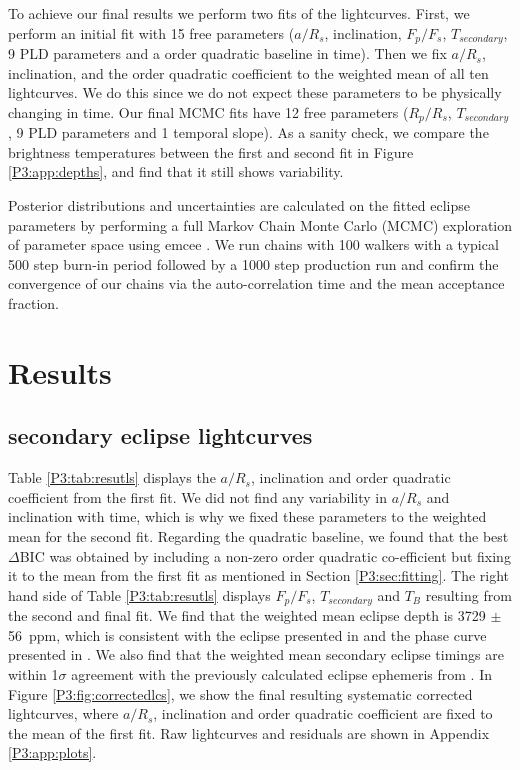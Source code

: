 To achieve our final results we perform two fits of the lightcurves. First, we perform an initial fit with 15 free parameters ($a/R_s$, inclination, $F_p/F_s$, $T_{secondary}$, 9 PLD parameters and a  order quadratic baseline in time). Then we fix $a/R_s$, inclination, and the  order quadratic coefficient to the weighted mean of all ten lightcurves. We do this since we do not expect these parameters to be physically changing in time. Our final MCMC fits have 12 free parameters ($R_p/R_s$, $T_{secondary}$, 9 PLD parameters and 1 temporal slope). As a sanity check, we compare the brightness temperatures between the first and second fit in Figure \ref{P3:app:depths}, and find that it still shows variability.

Posterior distributions and uncertainties are calculated on the fitted eclipse parameters by performing a full Markov Chain Monte Carlo (MCMC) exploration of parameter space using emcee \citep{Foreman-Mackey2013}. We run chains with 100 walkers with a typical 500 step burn-in period followed by a 1000 step production run and confirm the convergence of our chains via the auto-correlation time and the mean acceptance fraction.


\section{Results}
\subsection{\spitzerIRAC secondary eclipse lightcurves}
\label{P3:sec:lcresults}

Table \ref{P3:tab:resutls} displays the $a/R_s$, inclination and  order quadratic coefficient from the first fit. We did not find any variability in $a/R_s$ and inclination with time, which is why we fixed these parameters to the weighted mean for the second fit. Regarding the quadratic baseline, we found that the best $\Delta$BIC was obtained by including a non-zero  order quadratic co-efficient but fixing it to the mean from the first fit as mentioned in Section \ref{P3:sec:fitting}.
The right hand side of Table \ref{P3:tab:resutls} displays $F_p/F_s$, $T_{secondary}$ and $T_B$ resulting from the second and final fit. We find that the weighted mean eclipse depth is 3729 $\pm$ 56~ppm, which is consistent with the eclipse presented in \citet{Nymeyer2011} and the phase curve presented in \citet{Maxted2013}. We also find that the weighted mean secondary eclipse timings are within 1$\sigma$ agreement with the previously calculated eclipse ephemeris from \citet{Maxted2013}. In Figure \ref{P3:fig:correctedlcs}, we show the final resulting systematic corrected lightcurves, where $a/R_s$, inclination and  order quadratic coefficient are fixed to the mean of the first fit. Raw lightcurves and residuals are shown in Appendix \ref{P3:app:plots}.

